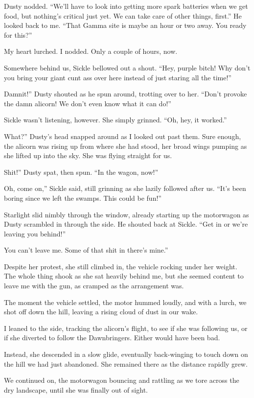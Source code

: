 Dusty nodded. “We’ll have to look into getting more spark batteries when we get food, but nothing’s critical just yet. We can take care of other things, first.” He looked back to me. “That Gamma site is maybe an hour or two away. You ready for this?”

My heart lurched. I nodded. Only a couple of hours, now.

Somewhere behind us, Sickle bellowed out a shout. “Hey, purple bitch! Why don’t you bring your giant cunt ass over here instead of just staring all the time!”

\leavevmode{}Damnit!” Dusty shouted as he spun around, trotting over to her. “Don’t provoke the damn alicorn! We don’t even know what it can do!”

Sickle wasn’t listening, however. She simply grinned. “Oh, hey, it worked.”

\leavevmode{}What?” Dusty’s head snapped around as I looked out past them. Sure enough, the alicorn was rising up from where she had stood, her broad wings pumping as she lifted up into the sky. She was flying straight for us.

\leavevmode{}Shit!” Dusty spat, then spun. “In the wagon, now!”

\leavevmode{}Oh, come on,” Sickle said, still grinning as she lazily followed after us. “It’s been boring since we left the swamps. This could be fun!”

Starlight slid nimbly through the window, already starting up the motorwagon as Dusty scrambled in through the side. He shouted back at Sickle. “Get in or we’re leaving you behind!”

\leavevmode{}You can’t leave me. Some of that shit in there’s mine.”

Despite her protest, she still climbed in, the vehicle rocking under her weight. The whole thing shook as she sat heavily behind me, but she seemed content to leave me with the gun, as cramped as the arrangement was.

The moment the vehicle settled, the motor hummed loudly, and with a lurch, we shot off down the hill, leaving a rising cloud of dust in our wake.

I leaned to the side, tracking the alicorn’s flight, to see if she was following us, or if she diverted to follow the Dawnbringers. Either would have been bad.

Instead, she descended in a slow glide, eventually back-winging to touch down on the hill we had just abandoned. She remained there as the distance rapidly grew.

We continued on, the motorwagon bouncing and rattling as we tore across the dry landscape, until she was finally out of sight.